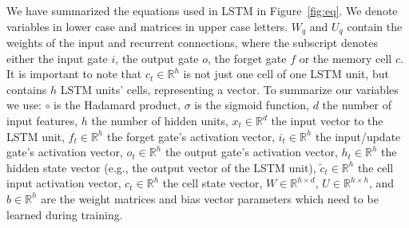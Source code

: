 \documentclass[12pt]{article}
\theoremstyle{definition}
\renewcommand{\_}{%
    \textunderscore\hspace{0pt}%
}
\begin{document}
\newcommand{\Rh}{\mathbb{R}^{h}}

We have summarized the equations used in LSTM in Figure~\ref{fig:eq}. We denote variables in lower case and matrices in upper case letters. $W_{q}$ and $U_{q}$ contain the weights of the input and recurrent connections, where the subscript denotes either the input gate $i$, the output gate $o$, the forget gate $f$ or the memory cell $c$.  It is important to note that  $c_{t}\in \mathbb {R}^{h}$ is not just one cell of one LSTM unit, but contains $h$ LSTM units' cells, representing a vector. To summarize our variables we use:
$\circ$ is the Hadamard product,
$\sigma$ is the sigmoid function,
$d$ the number of input features,
$h$ the number of hidden units,
$x_{t}\in \mathbb R^d$ the input vector to the LSTM unit,
$f_t\in \Rh$ the forget gate's activation vector,
$i_{t}\in \Rh$ the input/update gate's activation vector,
$o_{t}\in \Rh$ the output gate's activation vector,
$h_{t}\in \Rh$ the hidden state vector (e.g., the output vector of the LSTM unit),
$\tilde{c}_t\in \Rh$ the cell input activation vector,
$c_{t}\in \Rh$ the cell state vector,
$W\in \mathbb{R}^{h\times d}$, $U\in \mathbb{R} ^{h\times h}$, and $b\in \Rh$ are the weight matrices and bias vector parameters which need to be learned during training.

\end{document}
